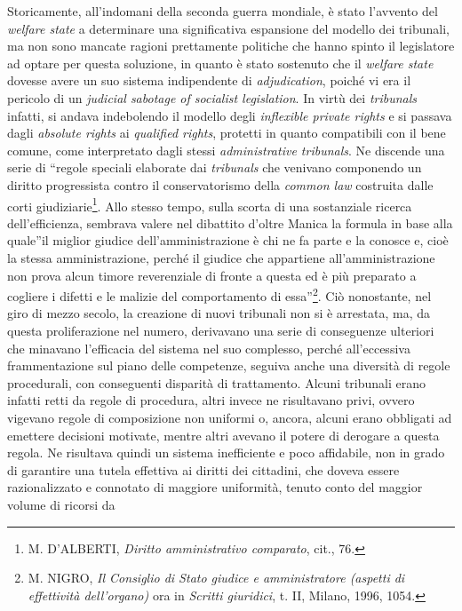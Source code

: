 \documentclass[12pt,it,a4paper,]{report}
\begin{document}
Storicamente, all'indomani della seconda guerra mondiale, è stato
l'avvento del \emph{welfare state} a determinare una significativa
espansione del modello dei tribunali, ma non sono mancate ragioni
prettamente politiche che hanno spinto il legislatore ad optare per
questa soluzione, in quanto è stato sostenuto che il \emph{welfare
state} dovesse avere un suo sistema indipendente di \emph{adjudication},
poiché vi era il pericolo di un \emph{judicial sabotage of socialist
legislation}. In virtù dei \emph{tribunals} infatti, si andava
indebolendo il modello degli \emph{inflexible private rights} e si
passava dagli \emph{absolute rights} ai \emph{qualified rights},
protetti in quanto compatibili con il bene comune, come interpretato
dagli stessi \emph{administrative tribunals}. Ne discende una serie di
``regole speciali elaborate dai \emph{tribunals} che venivano componendo
un diritto progressista contro il conservatorismo della \emph{common
law} costruita dalle corti giudiziarie\footnote{M. D'ALBERTI,
  \emph{Diritto amministrativo comparato}, cit., 76.}. Allo stesso
tempo, sulla scorta di una sostanziale ricerca dell'efficienza, sembrava
valere nel dibattito d'oltre Manica la formula in base alla quale''il
miglior giudice dell'amministrazione è chi ne fa parte e la conosce e,
cioè la stessa amministrazione, perché il giudice che appartiene
all'amministrazione non prova alcun timore reverenziale di fronte a
questa ed è più preparato a cogliere i difetti e le malizie del
comportamento di essa''\footnote{M. NIGRO, \emph{Il Consiglio di Stato
  giudice e amministratore (aspetti di effettività dell'organo)} ora in
  \emph{Scritti giuridici}, t. II, Milano, 1996, 1054.}. Ciò nonostante,
nel giro di mezzo secolo, la creazione di nuovi tribunali non si è
arrestata, ma, da questa proliferazione nel numero, derivavano una serie
di conseguenze ulteriori che minavano l'efficacia del sistema nel suo
complesso, perché all'eccessiva frammentazione sul piano delle
competenze, seguiva anche una diversità di regole procedurali, con
conseguenti disparità di trattamento. Alcuni tribunali erano infatti
retti da regole di procedura, altri invece ne risultavano privi, ovvero
vigevano regole di composizione non uniformi o, ancora, alcuni erano
obbligati ad emettere decisioni motivate, mentre altri avevano il potere
di derogare a questa regola. Ne risultava quindi un sistema inefficiente
e poco affidabile, non in grado di garantire una tutela effettiva ai
diritti dei cittadini, che doveva essere razionalizzato e connotato di
maggiore uniformità, tenuto conto del maggior volume di ricorsi da
\end{document}
